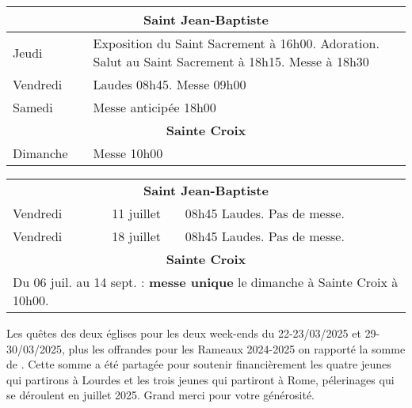 \documentclass[french,11pt]{article}
\begin{document}
\begin{tabular} {lcp{9cm}}
\multicolumn{3}{c}{\textbf{Saint Jean-Baptiste} } \\ \hline
Jeudi    & &
Exposition du Saint Sacrement à 16h00. Adoration. Salut au Saint Sacrement à 18h15. Messe à 18h30 
 \\ \hline
Vendredi & & Laudes 08h45. Messe 09h00 \\ \hline
Samedi   & & Messe anticipée 18h00 \\ \hline
\multicolumn{3}{c}{\textbf{Sainte Croix} } \\ \hline
Dimanche  & & Messe 10h00\\ \hline
\end{tabular}

\begin{framed}
\begin{tabular} {lcp{8cm}}
\multicolumn{3}{c}{\textbf{Saint Jean-Baptiste} } \\
Vendredi & 11 juillet  & 08h45 Laudes. Pas de messe. \\
Vendredi & 18 juillet  & 08h45 Laudes. Pas de messe. \\
\multicolumn{3}{c}{\textbf{Sainte Croix} } \\
\multicolumn{3}{l}{ Du 06 juil. au 14 sept. : \textbf{messe unique} le dimanche à Sainte Croix à 10h00.} \\
\end{tabular}
\end{framed}

\begin{framed}
Les quêtes des deux églises pour les deux week-ends du 22-23/03/2025 et 29-30/03/2025, plus les offrandes pour les Rameaux 2024-2025 on rapporté
la somme de . Cette somme a été partagée pour soutenir financièrement les quatre jeunes qui partirons à Lourdes et les trois jeunes qui partiront à Rome,
pélerinages qui se déroulent en juillet 2025. Grand merci pour votre générosité.
\end{framed}
\end{document}
